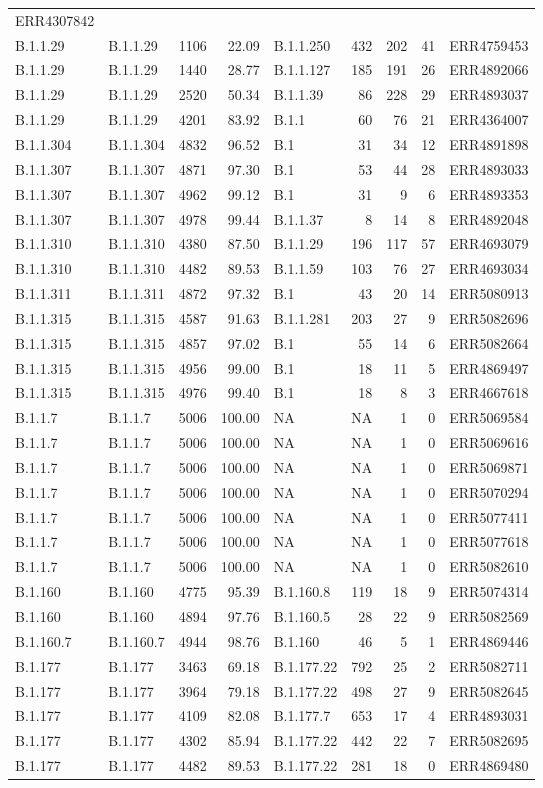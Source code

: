 \documentclass[
]{article}
\begin{document}
\begin{longtable}[]{@{}llrrlrrrl@{}}
ERR4307842\tabularnewline
B.1.1.29 & B.1.1.29 & 1106 & 22.09 & B.1.1.250 & 432 & 202 & 41 &
ERR4759453\tabularnewline
B.1.1.29 & B.1.1.29 & 1440 & 28.77 & B.1.1.127 & 185 & 191 & 26 &
ERR4892066\tabularnewline
B.1.1.29 & B.1.1.29 & 2520 & 50.34 & B.1.1.39 & 86 & 228 & 29 &
ERR4893037\tabularnewline
B.1.1.29 & B.1.1.29 & 4201 & 83.92 & B.1.1 & 60 & 76 & 21 &
ERR4364007\tabularnewline
B.1.1.304 & B.1.1.304 & 4832 & 96.52 & B.1 & 31 & 34 & 12 &
ERR4891898\tabularnewline
B.1.1.307 & B.1.1.307 & 4871 & 97.30 & B.1 & 53 & 44 & 28 &
ERR4893033\tabularnewline
B.1.1.307 & B.1.1.307 & 4962 & 99.12 & B.1 & 31 & 9 & 6 &
ERR4893353\tabularnewline
B.1.1.307 & B.1.1.307 & 4978 & 99.44 & B.1.1.37 & 8 & 14 & 8 &
ERR4892048\tabularnewline
B.1.1.310 & B.1.1.310 & 4380 & 87.50 & B.1.1.29 & 196 & 117 & 57 &
ERR4693079\tabularnewline
B.1.1.310 & B.1.1.310 & 4482 & 89.53 & B.1.1.59 & 103 & 76 & 27 &
ERR4693034\tabularnewline
B.1.1.311 & B.1.1.311 & 4872 & 97.32 & B.1 & 43 & 20 & 14 &
ERR5080913\tabularnewline
B.1.1.315 & B.1.1.315 & 4587 & 91.63 & B.1.1.281 & 203 & 27 & 9 &
ERR5082696\tabularnewline
B.1.1.315 & B.1.1.315 & 4857 & 97.02 & B.1 & 55 & 14 & 6 &
ERR5082664\tabularnewline
B.1.1.315 & B.1.1.315 & 4956 & 99.00 & B.1 & 18 & 11 & 5 &
ERR4869497\tabularnewline
B.1.1.315 & B.1.1.315 & 4976 & 99.40 & B.1 & 18 & 8 & 3 &
ERR4667618\tabularnewline
B.1.1.7 & B.1.1.7 & 5006 & 100.00 & NA & NA & 1 & 0 &
ERR5069584\tabularnewline
B.1.1.7 & B.1.1.7 & 5006 & 100.00 & NA & NA & 1 & 0 &
ERR5069616\tabularnewline
B.1.1.7 & B.1.1.7 & 5006 & 100.00 & NA & NA & 1 & 0 &
ERR5069871\tabularnewline
B.1.1.7 & B.1.1.7 & 5006 & 100.00 & NA & NA & 1 & 0 &
ERR5070294\tabularnewline
B.1.1.7 & B.1.1.7 & 5006 & 100.00 & NA & NA & 1 & 0 &
ERR5077411\tabularnewline
B.1.1.7 & B.1.1.7 & 5006 & 100.00 & NA & NA & 1 & 0 &
ERR5077618\tabularnewline
B.1.1.7 & B.1.1.7 & 5006 & 100.00 & NA & NA & 1 & 0 &
ERR5082610\tabularnewline
B.1.160 & B.1.160 & 4775 & 95.39 & B.1.160.8 & 119 & 18 & 9 &
ERR5074314\tabularnewline
B.1.160 & B.1.160 & 4894 & 97.76 & B.1.160.5 & 28 & 22 & 9 &
ERR5082569\tabularnewline
B.1.160.7 & B.1.160.7 & 4944 & 98.76 & B.1.160 & 46 & 5 & 1 &
ERR4869446\tabularnewline
B.1.177 & B.1.177 & 3463 & 69.18 & B.1.177.22 & 792 & 25 & 2 &
ERR5082711\tabularnewline
B.1.177 & B.1.177 & 3964 & 79.18 & B.1.177.22 & 498 & 27 & 9 &
ERR5082645\tabularnewline
B.1.177 & B.1.177 & 4109 & 82.08 & B.1.177.7 & 653 & 17 & 4 &
ERR4893031\tabularnewline
B.1.177 & B.1.177 & 4302 & 85.94 & B.1.177.22 & 442 & 22 & 7 &
ERR5082695\tabularnewline
B.1.177 & B.1.177 & 4482 & 89.53 & B.1.177.22 & 281 & 18 & 0 &
ERR4869480\tabularnewline

\end{longtable}
\end{document}
